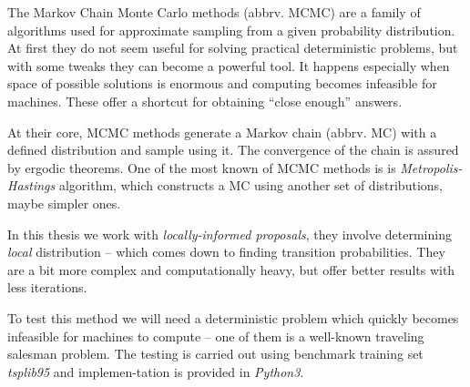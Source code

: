 The Markov Chain Monte Carlo methods (abbrv. MCMC) are a family of algorithms used for approximate sampling from a given probability distribution. At first they do not seem useful for solving practical deterministic problems, but with some tweaks they can become a powerful tool. It happens especially when space of possible solutions is enormous and computing becomes infeasible for machines. These offer a shortcut for obtaining ``close enough'' answers.
		
At their core, MCMC methods generate a Markov chain (abbrv. MC) with a defined distribution and sample using it. The convergence of the chain is assured by ergodic theorems. One of the most known of MCMC methods is is \textit{Metropolis-Hastings} algorithm, which constructs a MC using another set of distributions, maybe simpler ones.

In this thesis we work with \textit{locally-informed proposals}, they involve determining \textit{local} distribution -- which comes down to finding transition probabilities. They are a bit more complex and computationally heavy, but offer better results with less iterations. 

To test this method we will need a deterministic problem which quickly becomes infeasible for machines to compute -- one of them is a well-known traveling salesman problem. The testing is carried out using benchmark training set \textit{tsplib95} and implemen-tation is provided in \textit{Python3}.